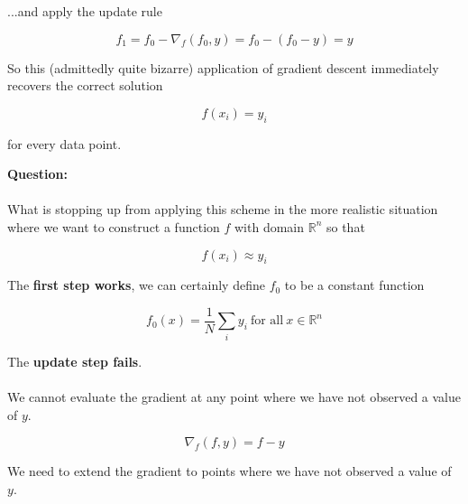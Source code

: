 %
\begin{frame}
...and apply the update rule

$$ f_1 = f_0 - \nabla_{f} (f_0, y) = f_0 - (f_0 - y) = y $$
\end{frame}
%
\begin{frame}
So this (admittedly quite bizarre) application of gradient descent immediately recovers the correct solution

$$ f(x_i) = y_i $$

for every data point.
\end{frame}
%
\begin{frame}

\begin{center}
\textbf{Question:}\\~\\

What is stopping up from applying this scheme in the more realistic situation where we want to construct a function $f$ with domain $\mathbb{R}^n$ so that
\end{center}

$$ f(x_i) \approx y_i $$
\end{frame}
%
\begin{frame}
The \textbf{first step works}, we can certainly define $f_0$ to be a constant function

$$ f_0(x) = \frac{1}{N} \sum_i y_i \ \text{for all} \ x \in \mathbb{R}^n $$
\end{frame}
%
\begin{frame}
The \textbf{update step fails}.\\~\\

We cannot evaluate the gradient at any point where we have not observed a value of $y$.

$$ \nabla_f (f, y) = f - y $$
\end{frame}
%
\begin{frame}

\begin{center}
{\huge We need to extend the gradient to points where we have not observed a value of $y$.}
\end{center}

\end{frame}

